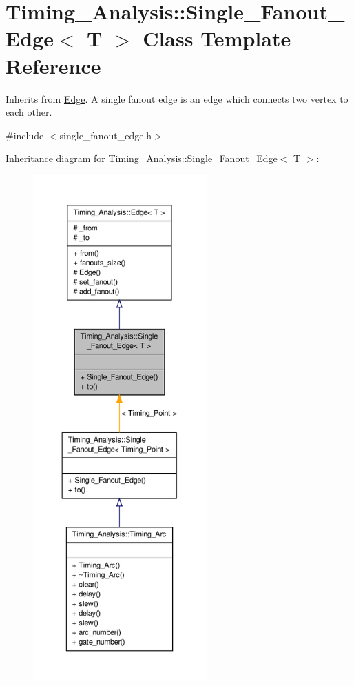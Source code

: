 \hypertarget{classTiming__Analysis_1_1Single__Fanout__Edge}{\section{Timing\-\_\-\-Analysis\-:\-:Single\-\_\-\-Fanout\-\_\-\-Edge$<$ T $>$ Class Template Reference}
\label{classTiming__Analysis_1_1Single__Fanout__Edge}
}


Inherits from \hyperlink{classTiming__Analysis_1_1Edge}{Edge}. A single fanout edge is an edge which connects two vertex to each other.  




{\ttfamily \#include $<$single\-\_\-fanout\-\_\-edge.\-h$>$}



Inheritance diagram for Timing\-\_\-\-Analysis\-:\-:Single\-\_\-\-Fanout\-\_\-\-Edge$<$ T $>$\-:\nopagebreak
\begin{figure}[H]
\begin{center}
\leavevmode
\includegraphics[height=550pt]{classTiming__Analysis_1_1Single__Fanout__Edge__inherit__graph}
\end{center}
\end{figure}


